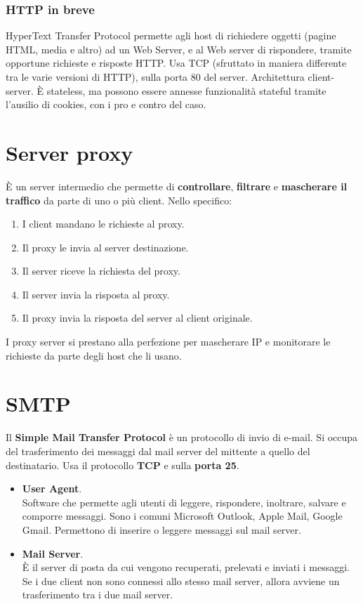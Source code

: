 \subsubsection{HTTP in breve}
HyperText Transfer Protocol permette agli host di richiedere oggetti (pagine HTML, media e altro) ad un Web Server, e al Web server di rispondere, tramite opportune richieste e risposte HTTP. Usa TCP (sfruttato in maniera differente tra le varie versioni di HTTP), sulla porta 80 del server. Architettura client-server. È stateless, ma possono essere annesse funzionalità stateful tramite l'ausilio di cookies, con i pro e contro del caso. 


\section{Server proxy}
È un server intermedio che permette di \textbf{controllare}, \textbf{filtrare} e \textbf{mascherare il traffico} da parte di uno o più client. Nello specifico:
\begin{enumerate}
    \item I client mandano le richieste al proxy.
    \item Il proxy le invia al server destinazione.
    \item Il server riceve la richiesta del proxy.
    \item Il server invia la risposta al proxy.
    \item Il proxy invia la risposta del server al client originale.
\end{enumerate}

I proxy server si prestano alla perfezione per mascherare IP e monitorare le richieste da parte degli host che li usano.
\newpage

\section{SMTP}
Il \textbf{Simple Mail Transfer Protocol} è un protocollo di invio di e-mail. Si occupa del trasferimento dei messaggi dal mail server del mittente a quello del destinatario.
Usa il protocollo \textbf{TCP} e sulla \textbf{porta 25}.

\begin{itemize}
    \item \textbf{User Agent}.\\
    Software che permette agli utenti di leggere, rispondere, inoltrare, salvare e comporre messaggi. Sono i comuni Microsoft Outlook, Apple Mail, Google Gmail. Permettono di inserire o leggere messaggi sul mail server.
    \item \textbf{Mail Server}.\\
    È il server di posta da cui vengono recuperati, prelevati e inviati i messaggi. Se i due client non sono connessi allo stesso mail server, allora avviene un trasferimento tra i due mail server.
\end{itemize}

